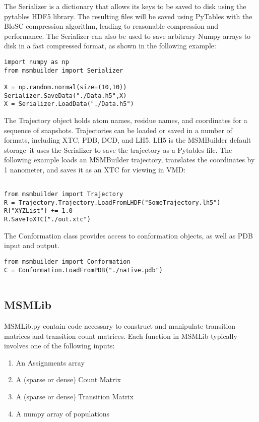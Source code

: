 \documentclass[12pt]{article}
\begin{document}
The Serializer is a dictionary that allows its keys to be saved to disk using the pytables HDF5 library.  The resulting files will be saved using PyTables with the BloSC compression algorithm, leading to reasonable compression and performance.  The Serializer can also be used to save arbitrary Numpy arrays to disk in a fast compressed format, as shown in the following example:

\begin{verbatim}
import numpy as np
from msmbuilder import Serializer

X = np.random.normal(size=(10,10))
Serializer.SaveData("./Data.h5",X)
X = Serializer.LoadData("./Data.h5")
\end{verbatim}

The Trajectory object holds atom names, residue names, and coordinates for a sequence of snapshots.  Trajectories can be loaded or saved in a number of formats, including XTC, PDB, DCD, and LH5.  LH5 is the MSMBuilder default storage--it uses the Serializer to save the trajectory as a Pytables file.  The following example loads an MSMBuilder trajectory, translates the coordinates by 1 nanometer, and saves it as an XTC for viewing in VMD:

\begin{verbatim}

from msmbuilder import Trajectory
R = Trajectory.Trajectory.LoadFromLHDF("SomeTrajectory.lh5")
R["XYZList"] += 1.0
R.SaveToXTC("./out.xtc")

\end{verbatim}

The Conformation class provides access to conformation objects, as well as PDB input and output.  

\begin{verbatim}
from msmbuilder import Conformation
C = Conformation.LoadFromPDB("./native.pdb")
 
\end{verbatim}

\subsection{MSMLib}

MSMLib.py contain code necessary to construct and manipulate transition matrices and transition count matrices.  Each function in MSMLib typically involves one of the following inputs:

\begin{enumerate}

\item An Assignments array
\item A (sparse or dense) Count Matrix
\item A (sparse or dense) Transition Matrix
\item A numpy array of populations

\end{enumerate}
\end{document}

